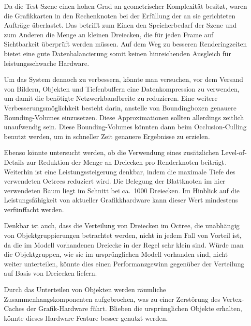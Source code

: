 Da die Test-Szene einen hohen Grad an geometrischer Komplexität besitzt, waren die Grafikkarten in den Rechenknoten bei der Erfüllung der an sie gerichteten Aufträge überlastet. Das betrifft zum Einen den Speicherbedarf der Szene und zum Anderen die Menge an kleinen Dreiecken, die für jeden Frame auf Sichtbarkeit überprüft werden müssen. Auf dem Weg zu besseren Renderingzeiten bietet eine gute Datenbalancierung somit keinen hinreichenden Ausgleich für leistungsschwache Hard\-ware. 

Um das System dennoch zu verbessern, könnte man versuchen, vor dem Versand von Bildern, Objekten und Tiefenbuffern eine Datenkompression zu verwenden, um damit die benötigte Netzwerkbandbreite zu reduzieren. Eine weitere Verbesserungsmöglichkeit besteht darin, anstelle von Boundingboxen genauere Bounding-Volumes einzusetzen. Diese Approximationen sollten allerdings zeitlich unaufwendig sein. Diese Bounding-Volumes könnten dann beim Occlusion-Culling benutzt werden, um in schneller Zeit genauere Ergebnisse zu erzielen.


Ebenso könnte untersucht werden, ob die Verwendung eines zusätzlichen Level-of-Details zur Reduktion der Menge an Dreiecken pro Renderknoten beiträgt. Weiterhin ist eine Leistungssteigerung denkbar, indem die maximale Tiefe des verwendeten Octrees reduziert wird. Die Belegung der Blattknoten im hier verwendeten Baum liegt im Schnitt bei ca.\ 1000 Dreiecken. Im Hinblick auf die Leistungsfähigkeit von aktueller Grafikkhardware kann dieser Wert mindestens verfünffacht werden. 

Denkbar ist auch, dass die Verteilung von Dreiecken im Octree, die unabhängig von Objektgruppierungen betrachtet werden, nicht in jedem Fall von Vorteil ist, da die im Modell vorhandenen Dreiecke in der Regel sehr klein sind. Würde man die Objektgruppen, wie sie im ursprünglichen Modell vorhanden sind, nicht weiter unterteilen, könnte dies einen Performanzgewinn gegenüber der Verteilung auf Basis von Dreiecken liefern. 

Durch das Unterteilen von Objekten werden räumliche Zusammenhangskomponenten aufgebrochen, was zu einer Zerstörung des Vertex-Caches der Grafik-Hardware führt. Blieben die ursprünglichen Objekte erhalten, könnte dieses Hardware-Feature besser genutzt werden.

%
%
